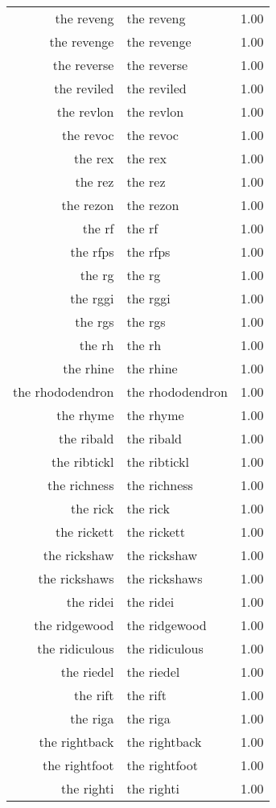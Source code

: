 \begin{table}[ht]
\begin{tabular}{rlr}
  the reveng & the reveng & 1.00 \\ 
  the revenge & the revenge & 1.00 \\ 
  the reverse & the reverse & 1.00 \\ 
  the reviled & the reviled & 1.00 \\ 
  the revlon & the revlon & 1.00 \\ 
  the revoc & the revoc & 1.00 \\ 
  the rex & the rex & 1.00 \\ 
  the rez & the rez & 1.00 \\ 
  the rezon & the rezon & 1.00 \\ 
  the rf & the rf & 1.00 \\ 
  the rfps & the rfps & 1.00 \\ 
  the rg & the rg & 1.00 \\ 
  the rggi & the rggi & 1.00 \\ 
  the rgs & the rgs & 1.00 \\ 
  the rh & the rh & 1.00 \\ 
  the rhine & the rhine & 1.00 \\ 
  the rhododendron & the rhododendron & 1.00 \\ 
  the rhyme & the rhyme & 1.00 \\ 
  the ribald & the ribald & 1.00 \\ 
  the ribtickl & the ribtickl & 1.00 \\ 
  the richness & the richness & 1.00 \\ 
  the rick & the rick & 1.00 \\ 
  the rickett & the rickett & 1.00 \\ 
  the rickshaw & the rickshaw & 1.00 \\ 
  the rickshaws & the rickshaws & 1.00 \\ 
  the ridei & the ridei & 1.00 \\ 
  the ridgewood & the ridgewood & 1.00 \\ 
  the ridiculous & the ridiculous & 1.00 \\ 
  the riedel & the riedel & 1.00 \\ 
  the rift & the rift & 1.00 \\ 
  the riga & the riga & 1.00 \\ 
  the rightback & the rightback & 1.00 \\ 
  the rightfoot & the rightfoot & 1.00 \\ 
  the righti & the righti & 1.00 \\ 

\end{tabular}
\end{table}
